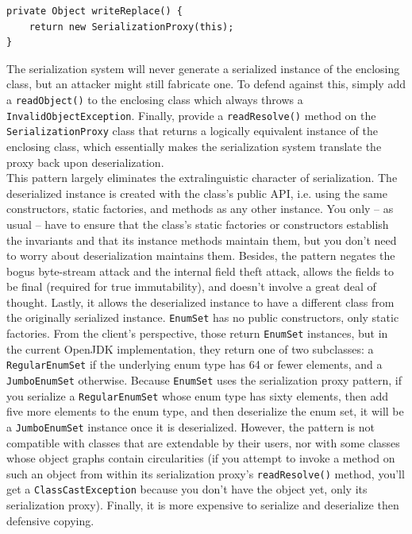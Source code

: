\documentclass[table, xcdraw]{article}%
\begin{document}
\begin{verbatim}
private Object writeReplace() {
    return new SerializationProxy(this);
}
\end{verbatim}

The serialization system will never generate a serialized instance of the enclosing class, but an attacker might still fabricate one. To defend against this, simply add a \texttt{readObject()} to the enclosing class which always throws a \texttt{InvalidObjectException}. Finally, provide a \texttt{readResolve()} method on the \texttt{SerializationProxy} class that returns a logically equivalent instance of the enclosing class, which essentially makes the serialization system translate the proxy back upon deserialization.\\
This pattern largely eliminates the extralinguistic character of serialization. The deserialized instance is created with the class's public API, i.e. using the same constructors, static factories, and methods as any other instance. You only -- as usual -- have to ensure that the class’s static factories or constructors establish the invariants and that its instance methods maintain them, but you don't need to worry about deserialization maintains them. Besides, the pattern negates the bogus byte-stream attack and the internal field theft attack, allows the fields to be final (required for true immutability), and doesn’t involve a great deal of thought. Lastly, it allows the deserialized instance to have a different class from the originally serialized instance. \texttt{EnumSet} has no public constructors, only static factories. From the client’s perspective, those return \texttt{EnumSet} instances, but in the current OpenJDK implementation, they return one of two subclasses: a \texttt{RegularEnumSet} if the underlying enum type has 64 or fewer elements, and a \texttt{JumboEnumSet} otherwise. Because \texttt{EnumSet} uses the serialization proxy pattern, if you serialize a \texttt{RegularEnumSet} whose enum type has sixty elements, then add five more elements to the enum type, and then deserialize the enum set, it will be a \texttt{JumboEnumSet} instance once it is deserialized. However, the pattern is not compatible with classes that are extendable by their users, nor with some classes whose object graphs contain circularities (if you attempt to invoke a method on such an object from within its serialization proxy’s \texttt{readResolve()} method, you’ll get a \texttt{ClassCastException} because you don’t have the object yet, only its serialization proxy). Finally, it is more expensive to serialize and deserialize then defensive copying.
\end{document}
